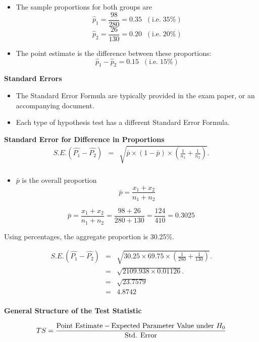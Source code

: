 \documentclass[a4paper,12pt]{article}
\begin{document}
\begin{itemize}
    \item The sample proportions for both groups are
    \[ \hat{p}_1 = \frac{98}{280} = 0.35 \;\;(\mbox{i.e.}\; 35\%) \] 
    \[ \hat{p}_2 = \frac{26}{130} = 0.20 \;\;(\mbox{i.e.}\; 20\%) \]  
    \item The point estimate is the difference between these proportions:
    \[ \hat{p}_1  - \hat{p}_2  = 0.15 \;\;(\mbox{i.e.}\; 15\%) \]
\end{itemize}
\noindent \textbf{Standard Errors}
\begin{itemize}
    \item The Standard Error Formula are typically provided in the exam paper, or an accompanying document.
    \item Each type of hypothesis test has a different Standard Error Formula.
\end{itemize}
\bigskip
\begin{framed}
\noindent \textbf{Standard Error for Difference in Proportions}\\
\begin{eqnarray*}
	S.E.(\hat{P_1}-\hat{P_2})&=&\sqrt{ \bar{p}\times(1-\bar{p}) \times \left(\frac{1}{n_1}+\frac{1}{n_2}\right)}.\\
\end{eqnarray*}
\begin{itemize}
    \item $\bar{p}$ is the overall proportion
\[    \bar{p} = \frac{x_1 + x_2}{n_1+n_2}\]
\end{itemize}
\end{framed}
\[    \bar{p} = \frac{x_1 + x_2}{n_1+n_2} = \frac{98 + 26}{280 + 130} = \frac{124}{410} = 0.3025 \]

\noindent Using percentages, the aggregate proportion is 30.25\%.

\begin{eqnarray*}
	S.E.(\hat{P_1}-\hat{P_2})&=&\sqrt{ 30.25 \times 69.75 \times \left(\frac{1}{280}+\frac{1}{130}\right)}.\\
	&=&\sqrt{ 2109.938 \times 0.01126}.\\
	&=&\sqrt{23.7579}\\
	&=& 4.8742 \\
\end{eqnarray*}


\noindent \textbf{General Structure of the Test Statistic}
\begin{framed}
\[ TS = {\mbox{Point Estimate} - \mbox{Expected Parameter Value under $H_{0}$} \over \mbox{Std. Error}}\]
\end{framed}
\medskip
\end{document}

